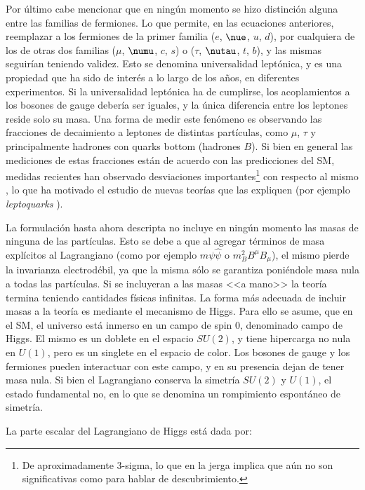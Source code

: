 Por último cabe mencionar que en ningún momento se hizo distinción alguna entre las familias de fermiones. Lo que permite, en las ecuaciones anteriores, reemplazar a los fermiones de la primer familia ($e$, $\nue$, $u$, $d$), por cualquiera de los de otras dos familias ($\mu$, $\numu$, $c$, $s$) o ($\tau$, $\nutau$, $t$, $b$), y las mismas seguirían teniendo validez.
Esto se denomina universalidad leptónica, y es una propiedad que ha sido de interés a lo largo de los años, en diferentes experimentos. Si la universalidad leptónica ha de cumplirse, los acoplamientos a los bosones de gauge debería ser iguales, y la única diferencia entre los leptones reside solo su masa. Una forma de medir este fenómeno es observando las fracciones de decaimiento a leptones de distintas partículas, como $\mu$, $\tau$ y principalmente hadrones con quarks bottom (hadrones $B$). Si bien en general las mediciones de estas fracciones están de acuerdo con las predicciones del SM, medidas recientes han observado desviaciones importantes\footnote{De aproximadamente 3-sigma, lo que en la jerga implica que aún no son significativas como para hablar de descubrimiento.} con respecto al mismo \cite{lepton_uni_1, lepton_uni_2}, lo que ha motivado el estudio de nuevas teorías que las expliquen (por ejemplo \textit{leptoquarks} \cite{leptoquark_1, Okumura:2744026}).




La formulación hasta ahora descripta no incluye en ningún momento las masas de ninguna de las partículas. Esto se debe a que al agregar términos de masa explícitos al Lagrangiano (como por ejemplo $m\psi\hat{\psi}$ o $m_B^2 B^{\mu}B_{\mu}$), el mismo pierde la invarianza electrodébil, ya que la misma sólo se garantiza poniéndole masa nula a todas las partículas. Si se incluyeran a las masas <<a mano>> la teoría termina teniendo cantidades físicas infinitas. 
La forma más adecuada de incluir masas a la teoría
es mediante el mecanismo de Higgs. Para ello se asume, que en el SM, el universo está inmerso en un campo de spin 0, denominado campo de Higgs. El mismo es un doblete en el espacio $SU(2)$, y tiene hipercarga no nula en $U(1)$, pero es un singlete en el espacio de color. 
Los bosones de gauge y los fermiones pueden interactuar con este campo, y en su presencia dejan de tener masa nula. Si bien el Lagrangiano conserva la simetría $SU(2)$ y $U(1)$, el estado fundamental no, en lo que se denomina un rompimiento espontáneo de simetría.

La parte escalar del Lagrangiano de Higgs está dada por:


